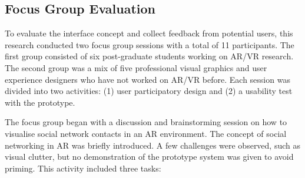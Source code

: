 \subsection{Focus Group Evaluation}

To evaluate the interface concept and collect feedback from potential users, this research conducted two focus group sessions with a total of 11 participants. The first group consisted of six post-graduate students working on AR/VR research. The second group was a mix of five professional visual graphics and user experience designers who have not worked on AR/VR before. Each session was divided into two activities: (1) user participatory design and (2) a usability test with the prototype. 

The focus group began with a discussion and brainstorming session on how to visualise social network contacts in an AR environment. The concept of social networking in AR was briefly introduced. A few challenges were observed, such as visual clutter, but no demonstration of the prototype system was given to avoid priming. This activity included three tasks: 

